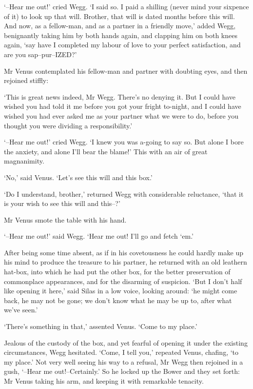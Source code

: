 ‘--Hear me out!’ cried Wegg. ‘I said so. I paid a shilling (never mind
your sixpence of it) to look up that will. Brother, that will is dated
months before this will. And now, as a fellow-man, and as a partner in a
friendly move,’ added Wegg, benignantly taking him by both hands again,
and clapping him on both knees again, ‘say have I completed my labour of
love to your perfect satisfaction, and are you sap--pur--IZED?’

Mr Venus contemplated his fellow-man and partner with doubting eyes, and
then rejoined stiffly:

‘This is great news indeed, Mr Wegg. There’s no denying it. But I could
have wished you had told it me before you got your fright to-night, and
I could have wished you had ever asked me as your partner what we were
to do, before you thought you were dividing a responsibility.’

‘--Hear me out!’ cried Wegg. ‘I knew you was a-going to say so. But
alone I bore the anxiety, and alone I’ll bear the blame!’ This with an
air of great magnanimity.

‘No,’ said Venus. ‘Let’s see this will and this box.’

‘Do I understand, brother,’ returned Wegg with considerable reluctance,
‘that it is your wish to see this will and this--?’

Mr Venus smote the table with his hand.

‘--Hear me out!’ said Wegg. ‘Hear me out! I’ll go and fetch ‘em.’

After being some time absent, as if in his covetousness he could hardly
make up his mind to produce the treasure to his partner, he returned
with an old leathern hat-box, into which he had put the other box,
for the better preservation of commonplace appearances, and for the
disarming of suspicion. ‘But I don’t half like opening it here,’ said
Silas in a low voice, looking around: ‘he might come back, he may not be
gone; we don’t know what he may be up to, after what we’ve seen.’

‘There’s something in that,’ assented Venus. ‘Come to my place.’

Jealous of the custody of the box, and yet fearful of opening it under
the existing circumstances, Wegg hesitated. ‘Come, I tell you,’ repeated
Venus, chafing, ‘to my place.’ Not very well seeing his way to a
refusal, Mr Wegg then rejoined in a gush, ‘--Hear me out!--Certainly.’
So he locked up the Bower and they set forth: Mr Venus taking his arm,
and keeping it with remarkable tenacity.

